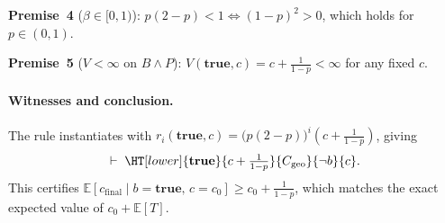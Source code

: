 \noindent\textbf{Premise~4} ($\beta \in [0,1)$):
$p(2-p) < 1 \iff (1-p)^2 > 0$, which holds for $p \in (0,1)$.

\noindent\textbf{Premise~5} ($V < \infty$ on $B\land P$):
$V(\mathbf{true},c) = c + \tfrac{1}{1-p} < \infty$ for any fixed $c$.

\paragraph{Witnesses and conclusion.}
The rule instantiates with $r_i(\mathbf{true},c) = \bigl(p(2-p)\bigr)^i\!\left(c+\tfrac{1}{1-p}\right)$,
giving
\[
  \vdash\; \HT[lower]{\mathbf{true}}{c + \tfrac{1}{1-p}}{C_{\text{geo}}}{\neg b}{c}.
\]
This certifies $\mathbb{E}[c_{\text{final}} \mid b=\mathbf{true},\, c=c_0] \geq c_0 + \tfrac{1}{1-p}$,
which matches the exact expected value of $c_0 + \mathbb{E}[T]$.





